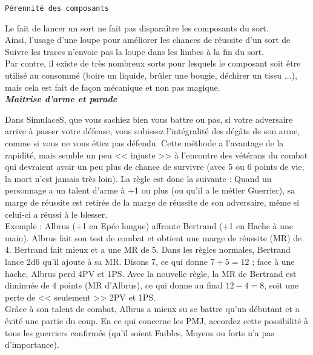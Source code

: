 \documentclass[11pt,twoside,a4paper]{article}
\begin{document}
\begin{multicols*}{3}
{\texttt{P{\'e}rennit{\'e} des composants}

Le fait de lancer un sort ne fait pas dispara{\^i}tre les composants du sort.~\\

Ainsi, l'usage d'une loupe pour am{\'e}liorer les chances de r{\'e}ussite d'un sort de Suivre les traces n'envoie pas la loupe dans les limbes {\`a} la fin du sort.~\\

Par contre, il existe de tr{\`e}s nombreux sorts pour lesquels le composant soit {\^e}tre utilis{\'e} au consomm{\'e} (boire un liquide, br{\^u}ler une bougie, d{\'e}chirer un tissu ...), mais cela est fait de fa\c{c}on m{\'e}canique et non pas magique.~\\

\textbf{\textit{Ma{\^i}trise d'arme et parade}}

Dans SimulaceS, que vous sachiez bien vous battre ou pas, si votre adversaire arrive {\`a} passer votre d{\'e}fense, vous subissez l'int{\'e}gralit{\'e} des d{\'e}g{\^a}ts de son arme, comme si vous ne vous {\'e}tiez pas d{\'e}fendu. Cette m{\'e}thode a l'avantage de la rapidit{\'e}, mais semble un peu << injuste >> {\`a} l'encontre des v{\'e}t{\'e}rans du combat qui devraient avoir un peu plus de chance de survivre (avec 5 ou 6 points de vie, la mort n'est jamais tr{\`e}s loin). La r{\`e}gle est donc la suivante : Quand un personnage a un talent d'arme {\`a} +1 ou plus (ou qu'il a le m{\'e}tier Guerrier), sa marge de r{\'e}ussite est retir{\'e}e de la marge de r{\'e}ussite de son adversaire, m{\^e}me si celui-ci a r{\'e}ussi {\`a} le blesser.~\\ 

Exemple : Albrus (+1 en Ep{\'e}e longue) affronte Bertrand (+1 en Hache {\`a} une main). Albrus fait son test de combat et obtient une marge de r{\'e}ussite (MR) de 4. Bertrand fait mieux et a une MR de 5. Dans les r{\`e}gles normales, Bertrand lance 2d6 qu'il ajoute {\`a} sa MR. Disons 7, ce qui donne $7+5=12$ ; face {\`a} une hache, Albrus perd 4PV et 1PS. Avec la nouvelle r{\`e}gle, la MR de Bertrand est diminu{\'e}e de 4 points (MR d'Albrus), ce qui donne au final $12-4=8$, soit une perte de << seulement >> 2PV et 1PS.~\\

Gr{\^a}ce {\`a} son talent de combat, Albrus a mieux su se battre qu'un d{\'e}butant et a {\'e}vit{\'e} une partie du coup. En ce qui concerne les PMJ, accordez cette possibilit{\'e} {\`a} tous les guerriers confirm{\'e}s (qu'il soient Faibles, Moyens ou forts n'a pas d'importance).~\\

}
\end{multicols*}
\end{document}
